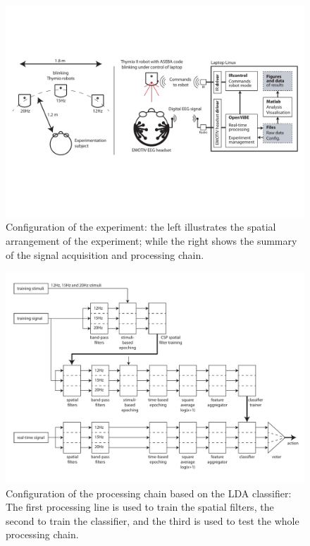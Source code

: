 \documentclass[smallextended]{svjour3}
\begin{document}
\begin{figure}
\center
\includegraphics[width=\textwidth]{figures/schema-global.pdf}
\caption{Configuration of the experiment: the left illustrates the spatial arrangement of the experiment; while the right shows the summary of the signal acquisition and processing chain.} \label{fig:thymioinstall}
\end{figure}

\begin{figure}
\center
\includegraphics[width=\textwidth]{figures/schema-openvibe.pdf}
\caption{Configuration of the processing chain based on the LDA classifier: The first processing line is used to train the spatial filters, the second to train the classifier, and the third is used to test the whole processing chain.} \label{fig:LDA}
\end{figure}
\end{document}
